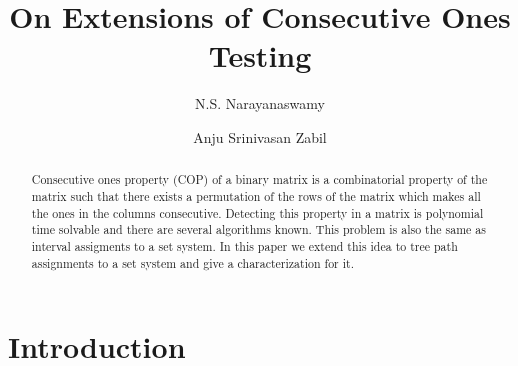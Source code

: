 \documentclass{llncs}
\begin{document}
\title{On Extensions of Consecutive Ones Testing}

\author{N.S. Narayanaswamy  \and Anju Srinivasan Zabil }



\date{}

\maketitle

\begin{abstract}
  Consecutive ones property (COP) of a binary matrix is a
  combinatorial property of the matrix such that there exists a
  permutation of the rows of the matrix which makes all the
  ones in the columns consecutive. Detecting this property in a
  matrix is polynomial time solvable and there are several algorithms
  known. This problem is also the same as interval assigments to a set
  system. In this paper we extend this idea to tree path assignments
  to a set system and give a characterization for it.
\end{abstract}

\section{Introduction}
\end{document}
